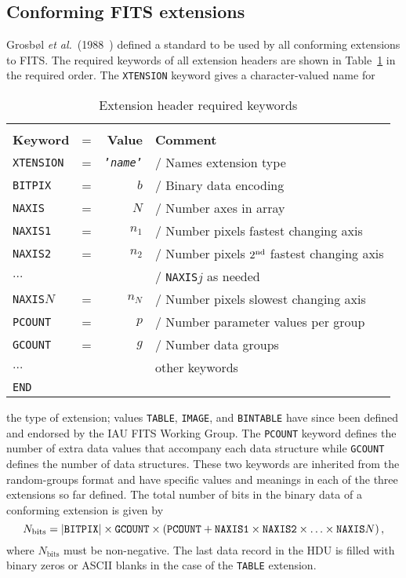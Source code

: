 \documentclass[twoside]{article}
\newcommand{\etal}{{\it et al.}}
\newcommand{\tablerowgapbefore}{-1ex}
\newcommand{\tablerowgapafter}{1ex}
\newcommand{\keyw}[1]{\hbox{{\tt #1}}}
\newcommand{\sub}[1]{_\mathrm{#1}}
\begin{document}
\subsection{Conforming FITS extensions}

Grosb\o l \etal~(1988~\cite{GHGW88}) defined a standard to be used by
all conforming extensions to FITS.  The required keywords of all
extension headers are shown in Table~\ref{tab:data.extenhead} in the
required order.  The \keyw{XTENSION} keyword gives a character-valued
name for
\begin{table}
\caption{Extension header required keywords}
\label{tab:data.extenhead}
\begin{center}
\begin{tabular}{|lrrl|}
\cline{1-4}
&  & & \\ [\tablerowgapbefore]
{\bf Keyword} & = & {\bf Value} & {\bf Comment} \\ [\tablerowgapafter]
\keyw{XTENSION} & = & \keyw{'{\it name}'} & / Names extension type \\
\keyw{BITPIX}   & = & $ b$  & / Binary data encoding \\
\keyw{NAXIS}    & = & $N$   & / Number axes in array \\
\keyw{NAXIS1}   & = & $n_1$ & / Number pixels fastest changing axis \\
\keyw{NAXIS2}   & = & $n_2$ & / Number pixels $2^{\rm nd}$ fastest
                             changing axis \\
$\ldots$       &   &       & / \keyw{NAXIS$j$} as needed \\
\keyw{NAXIS$N$} & = & $n_N$ & / Number pixels slowest changing axis \\
\keyw{PCOUNT}   & = & $p$   & / Number parameter values per group \\
\keyw{GCOUNT}   & = & $g$   & / Number data groups \\
$\ldots$       &   &       & other keywords \\
\keyw{END}      &   &       & \\ [\tablerowgapafter] \cline{1-4}
\end{tabular}
\end{center}
\end{table}
the type of extension; values \keyw{TABLE}, \keyw{IMAGE}, and
\keyw{BINTABLE} have since been defined and endorsed by the IAU FITS
Working Group.  The \keyw{PCOUNT} keyword defines the number of extra
data values that accompany each data structure while \keyw{GCOUNT}
defines the number of data structures.  These two keywords are
inherited from the random-groups format and have specific values and
meanings in each of the three extensions so far defined.  The total
number of bits in the binary data of a conforming extension is given
by
\begin{equation}
N\sub{bits} = | \keyw{BITPIX} | \times \keyw{GCOUNT} \times (
  \keyw{PCOUNT} + \keyw{NAXIS1} \times \keyw{NAXIS2} \times \ldots
  \times \keyw{NAXIS}N ) \, ,
\end{equation}
where $N\sub{bits}$ must be non-negative.  The last data record in
the HDU is filled with binary zeros or ASCII blanks in the case of the
\keyw{TABLE} extension.
\end{document}
